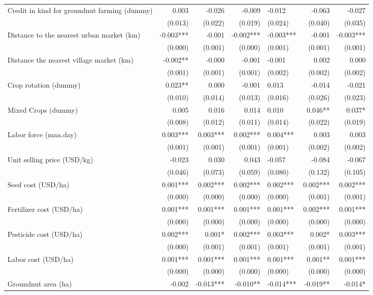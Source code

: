 \documentclass[
]{article}
\begin{document}
\begin{landscape}
\begin{longtable}[t]{lrrrlrr}
Credit in kind for groundnut farming (dummy) & 0.003 & -0.026 & -0.009 & -0.012 & -0.063 & -0.027\\
 & (0.013) & (0.022) & (0.019) & (0.024) & (0.040) & (0.035)\\
Distance to the nearest urban market (km) & -0.003*** & -0.001 & -0.002*** & -0.003*** & -0.001 & -0.003***\\
 & (0.000) & (0.001) & (0.000) & (0.001) & (0.001) & (0.001)\\
Distance the nearest village market (km) & -0.002** & -0.000 & -0.001 & -0.001 & 0.002 & 0.000\\
 & (0.001) & (0.001) & (0.001) & (0.002) & (0.002) & (0.002)\\
Crop rotation (dummy) & 0.023** & 0.000 & -0.001 & 0.013 & -0.014 & -0.021\\
 & (0.010) & (0.014) & (0.013) & (0.016) & (0.026) & (0.023)\\
Mixed Crops (dummy) & 0.005 & 0.016 & 0.014 & 0.010 & 0.046** & 0.037*\\
 & (0.008) & (0.012) & (0.011) & (0.014) & (0.022) & (0.019)\\
Labor force (man.day) & 0.003*** & 0.003*** & 0.002*** & 0.004*** & 0.003 & 0.003\\
 & (0.001) & (0.001) & (0.001) & (0.001) & (0.002) & (0.002)\\
Unit selling price (USD/kg) & -0.023 & 0.030 & 0.043 & -0.057 & -0.084 & -0.067\\
 & (0.046) & (0.073) & (0.059) & (0.080) & (0.132) & (0.105)\\
Seed cost (USD/ha) & 0.001*** & 0.002*** & 0.002*** & 0.002*** & 0.002*** & 0.002***\\
 & (0.000) & (0.000) & (0.000) & (0.000) & (0.001) & (0.001)\\
Fertilizer cost (USD/ha) & 0.001*** & 0.001*** & 0.001*** & 0.001*** & 0.002*** & 0.001***\\
 & (0.000) & (0.000) & (0.000) & (0.000) & (0.000) & (0.000)\\
Pesticide cost (USD/ha) & 0.002*** & 0.001* & 0.002*** & 0.003*** & 0.002* & 0.003***\\
 & (0.000) & (0.001) & (0.001) & (0.001) & (0.001) & (0.001)\\
Labor cost (USD/ha) & 0.001*** & 0.001*** & 0.001*** & 0.001*** & 0.001** & 0.001***\\
 & (0.000) & (0.000) & (0.000) & (0.000) & (0.000) & (0.000)\\
Groundnut area (ha) & -0.002 & -0.013*** & -0.010** & -0.014*** & -0.019** & -0.014*\\

\end{longtable}
\end{landscape}
\end{document}
